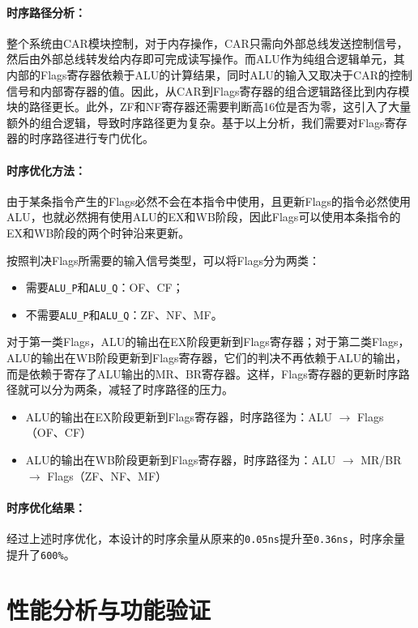 \documentclass[lang=cn,a4paper,newtx]{elegantpaper}
\begin{document}
\paragraph{时序路径分析：}

整个系统由CAR模块控制，对于内存操作，CAR只需向外部总线发送控制信号，然后由外部总线转发给内存即可完成读写操作。而ALU作为纯组合逻辑单元，其内部的Flags寄存器依赖于ALU的计算结果，同时ALU的输入又取决于CAR的控制信号和内部寄存器的值。因此，从CAR到Flags寄存器的组合逻辑路径比到内存模块的路径更长。此外，ZF和NF寄存器还需要判断高16位是否为零，这引入了大量额外的组合逻辑，导致时序路径更为复杂。基于以上分析，我们需要对Flags寄存器的时序路径进行专门优化。

\paragraph{时序优化方法：}
由于某条指令产生的Flags必然不会在本指令中使用，且更新Flags的指令必然使用ALU，也就必然拥有使用ALU的EX和WB阶段，因此Flags可以使用本条指令的EX和WB阶段的两个时钟沿来更新。

按照判决Flags所需要的输入信号类型，可以将Flags分为两类：
\begin{itemize}
  \item 需要\texttt{ALU\_P}和\texttt{ALU\_Q}：OF、CF；
  \item 不需要\texttt{ALU\_P}和\texttt{ALU\_Q}：ZF、NF、MF。
\end{itemize}

对于第一类Flags，ALU的输出在EX阶段更新到Flags寄存器；对于第二类Flags，ALU的输出在WB阶段更新到Flags寄存器，它们的判决不再依赖于ALU的输出，而是依赖于寄存了ALU输出的MR、BR寄存器。这样，Flags寄存器的更新时序路径就可以分为两条，减轻了时序路径的压力。
\begin{itemize}
  \item ALU的输出在EX阶段更新到Flags寄存器，时序路径为：ALU $\rightarrow$ Flags（OF、CF）
  \item ALU的输出在WB阶段更新到Flags寄存器，时序路径为：ALU $\rightarrow$ MR/BR $\rightarrow$ Flags（ZF、NF、MF）
\end{itemize}

\paragraph{时序优化结果：}
经过上述时序优化，本设计的时序余量从原来的\texttt{0.05ns}提升至\texttt{0.36ns}，时序余量提升了\texttt{600\%}。
\section{性能分析与功能验证}
\end{document}
